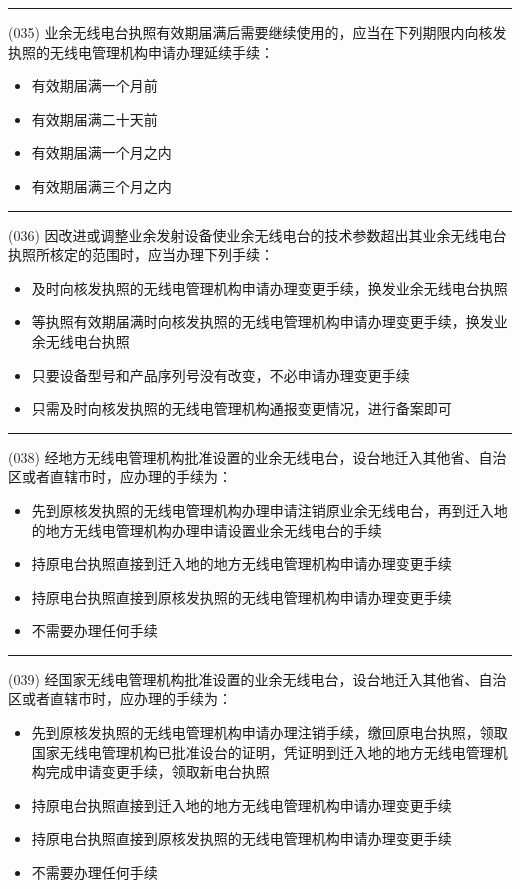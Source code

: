 \documentclass[twocolumn,hyperref,UTF8]{ctexart}  %
\begin{document}
\noindent\rule{0.5\textwidth}{1pt}
\heiti (035) 业余无线电台执照{\color{cyan}有效期届满}后需要继续使用的，应当在下列期限内向核发执照的无线电管理机构申请办理延续手续： \songti {\color{gray} [LK0044] }
\begin{itemize}
	\item  有效期届满一个月前
	\item  有效期届满二十天前
	\item  有效期届满一个月之内
	\item  有效期届满三个月之内
\end{itemize}


\noindent\rule{0.5\textwidth}{1pt}
\heiti (036) 因{\color{cyan}改进或调整业余发射设备}使业余无线电台的技术参数超出其业余无线电台执照所核定的范围时，应当办理下列手续： \songti {\color{gray} [LK0045] }
\begin{itemize}
	\item  及时向核发执照的无线电管理机构申请办理变更手续，换发业余无线电台执照
	\item  等执照有效期届满时向核发执照的无线电管理机构申请办理变更手续，换发业余无线电台执照
	\item  只要设备型号和产品序列号没有改变，不必申请办理变更手续
	\item  只需及时向核发执照的无线电管理机构通报变更情况，进行备案即可
\end{itemize}


\noindent\rule{0.5\textwidth}{1pt}
\heiti (038) 经{\color{cyan}地方}无线电管理机构批准设置的业余无线电台，{\color{cyan}设台地迁入}其他省、自治区或者直辖市时，应办理的手续为： \songti {\color{gray} [LK0089] }
\begin{itemize}
	\item  先到原核发执照的无线电管理机构办理申请注销原业余无线电台，再到迁入地的地方无线电管理机构办理申请设置业余无线电台的手续
	\item  持原电台执照直接到迁入地的地方无线电管理机构申请办理变更手续
	\item  持原电台执照直接到原核发执照的无线电管理机构申请办理变更手续
	\item  不需要办理任何手续
\end{itemize}


\noindent\rule{0.5\textwidth}{1pt}
\heiti (039) 经{\color{cyan}国家}无线电管理机构批准设置的业余无线电台，{\color{cyan}设台地迁入}其他省、自治区或者直辖市时，应办理的手续为： \songti {\color{gray} [LK0090] }
\begin{itemize}
	\item  先到原核发执照的无线电管理机构申请办理注销手续，缴回原电台执照，领取国家无线电管理机构已批准设台的证明，凭证明到迁入地的地方无线电管理机构完成申请变更手续，领取新电台执照
	\item  持原电台执照直接到迁入地的地方无线电管理机构申请办理变更手续
	\item  持原电台执照直接到原核发执照的无线电管理机构申请办理变更手续
	\item  不需要办理任何手续
\end{itemize}
\end{document}
